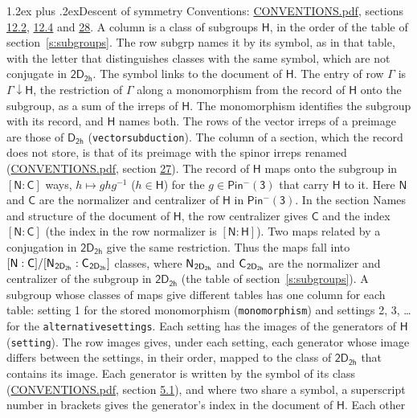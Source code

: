\documentclass[10pt,a4paper]{article}
\makeatletter
\renewcommand\section{\@startsection{section}{1}{\z@}{-3ex plus -1ex minus -.2ex}%
  {1.2ex plus .2ex}{\normalfont\large\sffamily\bfseries\color{parttitle}}}
\numberwithin{equation}{section}
\newcommand{\grp}[1]{\mathsf{#1}}
\newcommand{\grpindex}[2]{[#1 : #2]}
\newcommand{\restr}[2]{#1\!\downarrow#2}
\newcommand{\hairsp}{\mkern1mu}
\makeatother
\begin{document}
\section{Descent of symmetry}\label{s:subduction}
Conventions: \href{../../CONVENTIONS.pdf}{CONVENTIONS.pdf}, sections \href{../../../rotation/CONVENTIONS.pdf\#conv.12.2}{12.2}, \href{../../../rotation/CONVENTIONS.pdf\#conv.12.4}{12.4} and \href{../../CONVENTIONS.pdf\#conv.28}{28}.
A column is a class of subgroups $\grp{H}$, in the order of the table of section~\ref{s:subgroups}. The row subgrp names it by its symbol, as in that table, with the letter that distinguishes classes with the same symbol, which are not conjugate in $\grp{2D_{2h}}$. The symbol links to the document of $\grp{H}$. The entry of row $\Gamma$ is $\restr{\Gamma}{\grp{H}}$, the restriction of $\Gamma$ along a monomorphism from the record of $\grp{H}$ onto the subgroup, as a sum of the irreps of $\grp{H}$. The monomorphism identifies the subgroup with its record, and $\grp{H}$ names both. The rows of the vector irreps of a preimage are those of \href{../../../rotation/data/pdf/D2h.pdf}{$\grp{D_{2h}}$} (\texttt{vectorsubduction}). The column of a section, which the record does not store, is that of its preimage with the spinor irreps renamed (\href{../../CONVENTIONS.pdf}{CONVENTIONS.pdf}, section \href{../../CONVENTIONS.pdf\#conv.27}{27}). \label{n:group.normalizer.o3}\label{n:group.centralizer.o3}\label{n:element.h}The record of $\grp{H}$ maps onto the subgroup in $\grpindex{\grp{N}}{\grp{C}}$ ways, $h \mapsto g h g^{-1}$ ($h \in \grp{H}$) for the $g \in \grp{Pin^{-}(3)}$ that carry $\grp{H}$ to it. Here $\grp{N}$ and $\grp{C}$ are the normalizer and centralizer of $\grp{H}$ in \href{Pinminus3.pdf}{$\grp{Pin^{-}(3)}$}. In the section Names and structure of the document of $\grp{H}$, the row centralizer gives $\grp{C}$ and the index $\grpindex{\grp{N}}{\grp{C}}$ (the index in the row normalizer is $\grpindex{\grp{N}}{\grp{H}}$). Two maps related by a conjugation in $\grp{2D_{2h}}$ give the same restriction. Thus the maps fall into $\grpindex{\grp{N}}{\grp{C}}/\grpindex{\grp{N}_{\hairsp \grp{2D_{2h}}}}{\grp{C}_{\hairsp \grp{2D_{2h}}}}$ classes, where $\grp{N}_{\hairsp \grp{2D_{2h}}}$ and $\grp{C}_{\hairsp \grp{2D_{2h}}}$ are the normalizer and centralizer of the subgroup in $\grp{2D_{2h}}$ (the table of section~\ref{s:subgroups}). \label{n:head.setting}A subgroup whose classes of maps give different tables has one column for each table: setting 1 for the stored monomorphism (\texttt{monomorphism}) and settings 2, 3, \dots{} for the \texttt{alternativesettings}. Each setting has the images of the generators of $\grp{H}$ (\texttt{setting}). \label{n:head.images}The row images gives, under each setting, each generator whose image differs between the settings, in their order, mapped to the class of $\grp{2D_{2h}}$ that contains its image. \label{n:element.generator.index}Each generator is written by the symbol of its class (\href{../../CONVENTIONS.pdf}{CONVENTIONS.pdf}, section \href{../../../rotation/CONVENTIONS.pdf\#conv.5.1}{5.1}), and where two share a symbol, a superscript number in brackets gives the generator's index in the document of $\grp{H}$. \label{n:irrep.Delta}Each other 
\end{document}
